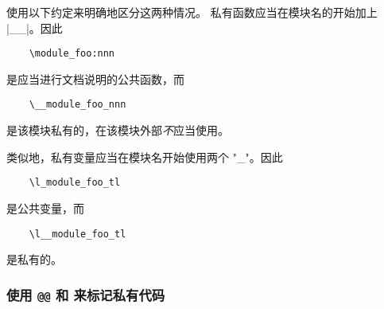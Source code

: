 \documentclass[full]{l3doc}
\begin{document}
使用以下约定来明确地区分这两种情况。
私有函数应当在模块名的开始加上 |__|。因此
\begin{verbatim}
    \module_foo:nnn
\end{verbatim}
是应当进行文档说明的公共函数，而
\begin{verbatim}
    \__module_foo_nnn
\end{verbatim}
是该模块私有的，在该模块外部\emph{不}应当使用。

%
%

类似地，私有变量应当在模块名开始使用两个 "_"。因此
\begin{verbatim}
    \l_module_foo_tl
\end{verbatim}
是公共变量，而
\begin{verbatim}
    \l__module_foo_tl
\end{verbatim}
是私有的。

\subsubsection{使用 \texttt{@@} 和  来标记私有代码}
\end{document}
